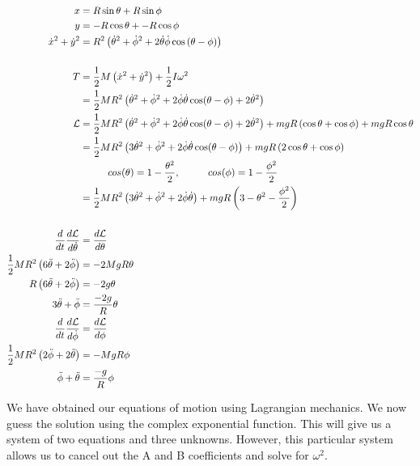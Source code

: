 \documentclass[10pt]{article} %
\begin{document}
\begin{align*}
  x &= R\sin\theta + R\sin\phi\\
  y &= -R\cos\theta + -R\cos\phi\\
  \dot{x}^2 + \dot{y}^2 &= R^2\left(\dot{\theta}^2 + \dot{\phi}^2 + 2\dot{\theta}\dot{\phi}\cos\left(\theta-\phi\right)\right)\\
  \vspace{1cm}\\
  T &= \frac{1}{2}M\left(\dot{x}^2+\dot{y}^2\right) + \frac{1}{2}I\omega^2\\
  &= \frac{1}{2}MR^2\left(\dot{\theta}^2 + \dot{\phi}^2 + 2\dot{\phi}\dot{\theta}\cos(\theta-\phi) + 2\dot{\theta}^2\right)\\
  \mathcal{L} &= \frac{1}{2}MR^2\left(\dot{\theta}^2 + \dot{\phi}^2 + 2\dot{\phi}\dot{\theta}\cos(\theta-\phi) + 2\dot{\theta}^2\right) + mgR\left(\cos\theta + \cos\phi\right) + mgR\cos\theta\\
  &= \frac{1}{2}MR^2\left(3\dot{\theta}^2 + \dot{\phi}^2 + 2\dot{\phi}\dot{\theta}\cos(\theta-\phi)\right) + mgR\left(2\cos\theta + \cos\phi\right)\\
  &\hspace{1cm} cos(\theta) = 1 - \frac{\theta^2}{2},\hspace{1cm} cos(\phi) = 1 - \frac{\phi^2}{2}\\
  &= \frac{1}{2}MR^2\left(3\dot{\theta}^2 + \dot{\phi}^2 + 2\dot{\phi}\dot{\theta}\right) + mgR\left(3 - \theta^2 - \frac{\phi^2}{2}\right)\\
  \vspace{1cm}\\
  \frac{d}{dt}\frac{d\mathcal{L}}{d\dot{\theta}} &= \frac{d\mathcal{L}}{d\theta}\\
  \frac{1}{2}MR^2\left(6\ddot{\theta} + 2\ddot{\phi}\right) &= -2MgR\theta\\
  R\left(6\ddot{\theta} + 2\ddot{\phi}\right) &= -2g\theta\\
  3\ddot{\theta} + \ddot{\phi} &= \frac{-2g}{R}\theta\\
  \frac{d}{dt}\frac{d\mathcal{L}}{d\dot{\phi}} &= \frac{d\mathcal{L}}{d\phi}\\
  \frac{1}{2}MR^2\left(2\ddot{\phi} + 2\ddot{\theta}\right) &= -MgR\phi\\
  \ddot{\phi} + \ddot{\theta} &= \frac{-g}{R}\phi\\
\end{align*}

We have obtained our equations of motion using Lagrangian mechanics. We now guess the solution using the complex exponential function. This will give us a system of two equations and three unknowns. However, this particular system allows us to cancel out the A and B coefficients and solve for $\omega^2$.\\
\end{document}
